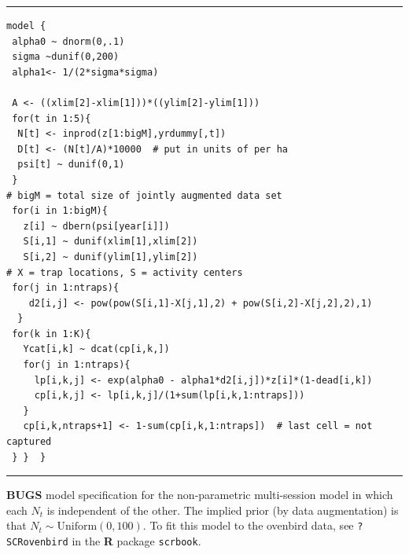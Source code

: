 \begin{panel}[htp]
\centering
\rule[0.15in]{\textwidth}{.03in}
{\small
\begin{verbatim}
model {
 alpha0 ~ dnorm(0,.1)
 sigma ~dunif(0,200)
 alpha1<- 1/(2*sigma*sigma)

 A <- ((xlim[2]-xlim[1]))*((ylim[2]-ylim[1]))
 for(t in 1:5){
  N[t] <- inprod(z[1:bigM],yrdummy[,t])
  D[t] <- (N[t]/A)*10000  # put in units of per ha
  psi[t] ~ dunif(0,1)
 }
# bigM = total size of jointly augmented data set
 for(i in 1:bigM){
   z[i] ~ dbern(psi[year[i]])
   S[i,1] ~ dunif(xlim[1],xlim[2])
   S[i,2] ~ dunif(ylim[1],ylim[2])
# X = trap locations, S = activity centers
 for(j in 1:ntraps){
    d2[i,j] <- pow(pow(S[i,1]-X[j,1],2) + pow(S[i,2]-X[j,2],2),1)
  }
 for(k in 1:K){
   Ycat[i,k] ~ dcat(cp[i,k,])
   for(j in 1:ntraps){
     lp[i,k,j] <- exp(alpha0 - alpha1*d2[i,j])*z[i]*(1-dead[i,k])        
     cp[i,k,j] <- lp[i,k,j]/(1+sum(lp[i,k,1:ntraps]))
   }
   cp[i,k,ntraps+1] <- 1-sum(cp[i,k,1:ntraps])  # last cell = not captured
 } }  }
\end{verbatim}
}
\rule[-0.15in]{\textwidth}{.03in}
\caption{
{\bf BUGS} model specification for the non-parametric multi-session
model in which each $N_{t}$ is independent of the other. The implied
prior (by data augmentation) is that $N_{t} \sim
\mbox{Uniform}(0,100)$. 
To fit this model to the ovenbird data, see
 \mbox{\tt ?SCRovenbird} in the {\bf R} package \mbox{\tt scrbook}.
}
\label{poisson-mn.panel.ovenbird}
\end{panel}



